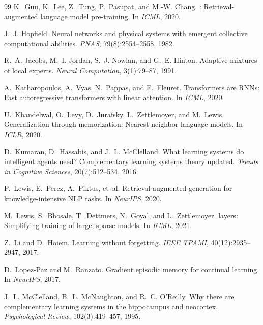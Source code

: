 \documentclass[11pt,a4paper]{article}
\begin{document}
\begin{thebibliography}{99}
K.~Guu, K.~Lee, Z.~Tung, P.~Pasupat, and M.-W. Chang.
: Retrieval-augmented language model pre-training.
\newblock In \emph{ICML}, 2020.

J.~J. Hopfield.
\newblock Neural networks and physical systems with emergent collective
computational abilities.
\newblock \emph{PNAS}, 79(8):2554--2558, 1982.

R.~A. Jacobs, M.~I. Jordan, S.~J. Nowlan, and G.~E. Hinton.
\newblock Adaptive mixtures of local experts.
\newblock \emph{Neural Computation}, 3(1):79--87, 1991.

A.~Katharopoulos, A.~Vyas, N.~Pappas, and F.~Fleuret.
\newblock Transformers are {RNN}s: Fast autoregressive transformers with linear
attention.
\newblock In \emph{ICML}, 2020.

U.~Khandelwal, O.~Levy, D.~Jurafsky, L.~Zettlemoyer, and M.~Lewis.
\newblock Generalization through memorization: Nearest neighbor language models.
\newblock In \emph{ICLR}, 2020.

D.~Kumaran, D.~Hassabis, and J.~L. McClelland.
\newblock What learning systems do intelligent agents need? Complementary
learning systems theory updated.
\newblock \emph{Trends in Cognitive Sciences}, 20(7):512--534, 2016.

P.~Lewis, E.~Perez, A.~Piktus, et~al.
\newblock Retrieval-augmented generation for knowledge-intensive {NLP} tasks.
\newblock In \emph{NeurIPS}, 2020.

M.~Lewis, S.~Bhosale, T.~Dettmers, N.~Goyal, and L.~Zettlemoyer.
 layers: Simplifying training of large, sparse models.
\newblock In \emph{ICML}, 2021.

Z.~Li and D.~Hoiem.
\newblock Learning without forgetting.
\newblock \emph{IEEE TPAMI}, 40(12):2935--2947, 2017.

D.~Lopez-Paz and M.~Ranzato.
\newblock Gradient episodic memory for continual learning.
\newblock In \emph{NeurIPS}, 2017.

J.~L. McClelland, B.~L. McNaughton, and R.~C. O'Reilly.
\newblock Why there are complementary learning systems in the hippocampus and
neocortex.
\newblock \emph{Psychological Review}, 102(3):419--457, 1995.


\end{thebibliography}
\end{document}
